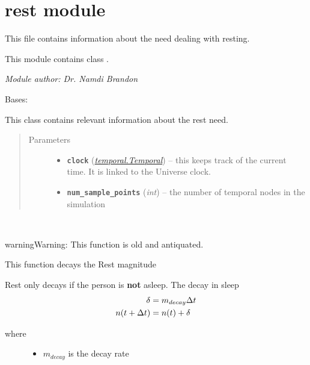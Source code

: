 \documentclass[letterpaper,10pt,english]{sphinxmanual}
\begin{document}
\section{rest module}
\label{rest::doc}\label{rest:module-rest}\label{rest:rest-module}
This file contains information about the need dealing with resting.

This module contains class {\hyperref[rest:rest.Rest]{\emph{}}}.

\emph{Module author: Dr. Namdi Brandon}

\begin{fulllineitems}
\label{rest:rest.Rest}
Bases: {\hyperref[need:need.Need]{\emph{}}}

This class contains relevant information about the rest need.
\begin{quote}\begin{description}
\item[{Parameters}] \leavevmode\begin{itemize}
\item {} 
\textbf{\texttt{clock}} ({\hyperref[temporal:temporal.Temporal]{\emph{\emph{temporal.Temporal}}}}) -- this keeps track of the current time. It is linked to the Universe clock.

\item {} 
\textbf{\texttt{num\_sample\_points}} (\emph{int}) -- the number of temporal nodes in the simulation

\end{itemize}

\end{description}\end{quote}

\begin{fulllineitems}
\label{rest:rest.Rest.decay}~
\begin{notice}{warning}{Warning:}
This function is old and antiquated.
\end{notice}

This function decays the Rest magnitude

Rest only decays if the person is \textbf{not} asleep.  The decay in sleep
\begin{gather}
\begin{split}\delta &= m_{decay} \Delta{t} \\
n(t + \Delta{t}) &= n(t) + \delta\end{split}\notag
\end{gather}\begin{description}
\item[{where}] \leavevmode\begin{itemize}
\item {} 
\(m_{decay}\) is the decay rate


\end{itemize}
\end{description}
\end{fulllineitems}
\end{fulllineitems}
\end{document}
